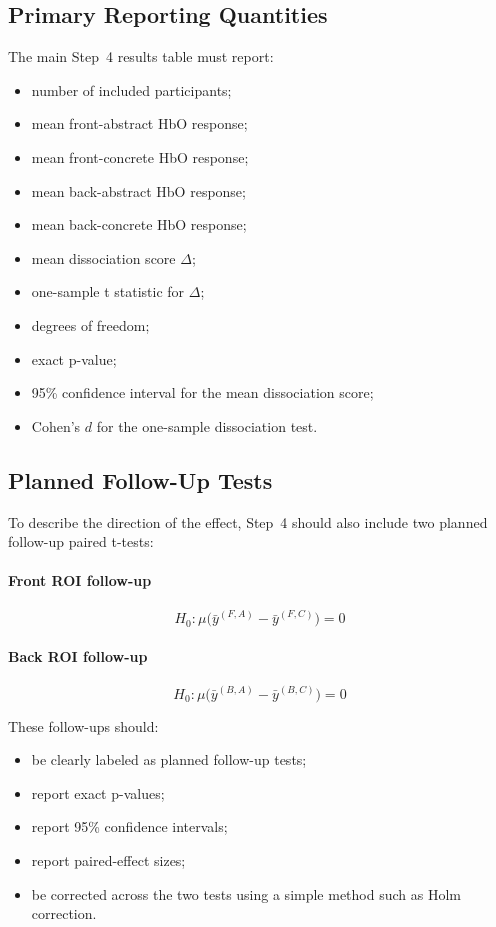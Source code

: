 \subsection{Primary Reporting Quantities}
The main Step~4 results table must report:
\begin{itemize}
    \item number of included participants;
    \item mean front-abstract HbO response;
    \item mean front-concrete HbO response;
    \item mean back-abstract HbO response;
    \item mean back-concrete HbO response;
    \item mean dissociation score \(\Delta\);
    \item one-sample t statistic for \(\Delta\);
    \item degrees of freedom;
    \item exact p-value;
    \item 95\% confidence interval for the mean dissociation score;
    \item Cohen's \(d\) for the one-sample dissociation test.
\end{itemize}

\subsection{Planned Follow-Up Tests}
To describe the direction of the effect, Step~4 should also include two planned follow-up paired t-tests:

\paragraph{Front ROI follow-up}
\begin{equation}
H_0: \mu\bigl(\bar{y}^{(F,A)} - \bar{y}^{(F,C)}\bigr) = 0
\end{equation}

\paragraph{Back ROI follow-up}
\begin{equation}
H_0: \mu\bigl(\bar{y}^{(B,A)} - \bar{y}^{(B,C)}\bigr) = 0
\end{equation}

These follow-ups should:
\begin{itemize}
    \item be clearly labeled as planned follow-up tests;
    \item report exact p-values;
    \item report 95\% confidence intervals;
    \item report paired-effect sizes;
    \item be corrected across the two tests using a simple method such as Holm correction.
\end{itemize}

